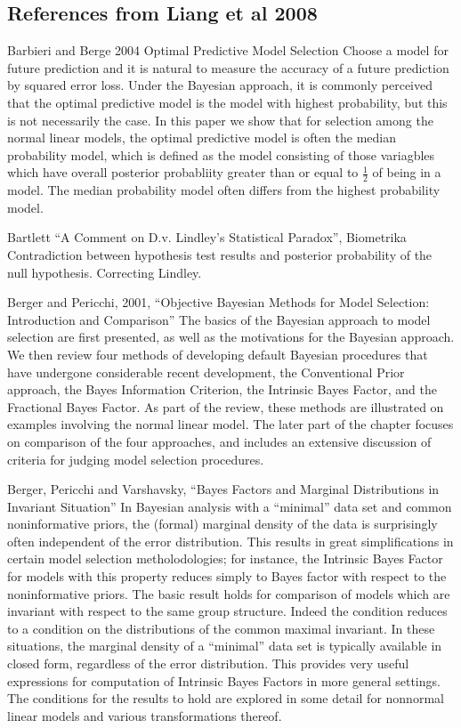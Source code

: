 \documentclass{amsart}[12pt]
\begin{document}
\subsection{References from Liang et al 2008}
Barbieri and Berge 2004 Optimal Predictive Model Selection
Choose a model for future prediction and it is natural to measure the accuracy of a future prediction by
squared error loss. Under the Bayesian approach, it is commonly perceived that the optimal predictive model is
the model with highest probability, but this is not necessarily the case. In this paper we show that for
selection among the normal linear models, the optimal predictive model is often the median probability model,
which is defined as the model consisting of those variagbles which have overall posterior probabliity greater
than or equal to $\frac{1}{2}$ of being in a model. The median probability model often differs from the highest
probability model.

Bartlett ``A Comment on D.v. Lindley's Statistical Paradox'', Biometrika
Contradiction between hypothesis test results and posterior probability of the null hypothesis. Correcting 
Lindley.

Berger and Pericchi, 2001, ``Objective Bayesian Methods for Model Selection: Introduction and Comparison''
The basics of the Bayesian approach to model selection are first presented, as well as the motivations for the
Bayesian approach. We then review four methods of developing default Bayesian procedures that have undergone
considerable recent development, the Conventional Prior approach, the Bayes Information Criterion, the
Intrinsic Bayes Factor, and the Fractional Bayes Factor. As part of the review, these methods are illustrated
on examples involving the normal linear model. The later part of the chapter focuses on comparison of the
four approaches, and includes an extensive discussion of criteria for judging model selection procedures.

Berger, Pericchi and Varshavsky, ``Bayes Factors and Marginal Distributions in Invariant Situation''
In Bayesian analysis with a ``minimal'' data set and common noninformative priors, the (formal) marginal
density of the data is surprisingly often independent of the error distribution. This results in great
simplifications in certain model selection metholodologies; for instance, the Intrinsic Bayes Factor for
models with this property reduces simply to Bayes factor with respect to the noninformative priors. The basic
result holds for comparison of models which are invariant with respect to the same group structure. Indeed the
condition reduces to a condition on the distributions of the common maximal invariant. In these situations,
the marginal density of a ``minimal'' data set is typically available in closed form, regardless of the error
distribution. This provides very useful expressions for computation of Intrinsic Bayes Factors in more general
settings. The conditions for the results to hold are explored in some detail for nonnormal linear models and
various transformations thereof.
\end{document}
